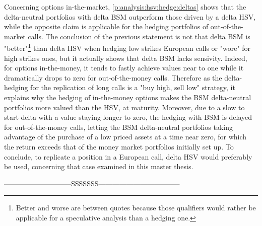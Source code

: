 \documentclass[12pt]{report}
\begin{document}
Concerning options in-the-market, \cref{p:analysis:hsv:hedge:deltas} shows that the delta-neutral portfolios with delta BSM outperform those driven by a delta HSV, while the opposite claim is applicable for the hedging portfolios of out-of-the-market calls.
The conclusion of the previous statement is not that delta BSM is "better"\footnote{Better and worse are between quotes because those qualifiers would rather be applicable for a speculative analysis than a hedging one.} than delta HSV when hedging low strikes European calls or "wore" for high strikes ones, but it actually shows that delta BSM lacks sensivity.
Indeed, for options in-the-money, it tends to fastly achieve values near to one while it dramatically drops to zero for out-of-the-money calls.
Therefore as the delta-hedging for the replication of long calls is a "buy high, sell low" strategy, it explains why the hedging of in-the-money options makes the BSM delta-neutral portfolios more valued than the HSV, at maturity. 
Moreover, due to a slow to start delta with a value staying longer to zero, the hedging with BSM is delayed for out-of-the-money calls, letting the BSM delta-neutral portfolios taking advantage of the purchase of a low priced assets at a time near zero, for which the return exceeds that of the money market portfolios initially set up.
To conclude, to replicate a position in a European call, delta HSV would preferably be used, concerning that case examined in this master thesis. 




-----------------------------SSSSSSS-----------------------------------

\end{document}

